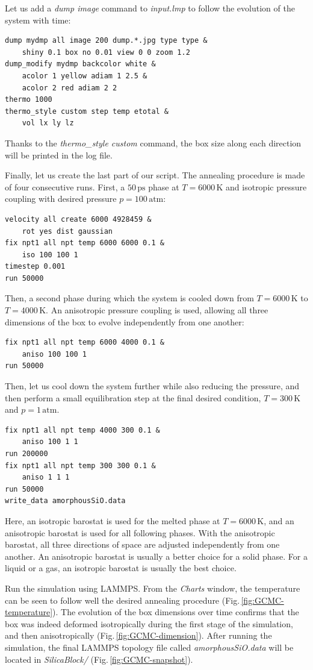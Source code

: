 \documentclass[9pt,tutorial]{livecoms}
\begin{document}
Let us add a \textit{dump image} command to \textit{input.lmp} to follow the
evolution of the system with time:
{\normalsize \begin{verbatim}
dump mydmp all image 200 dump.*.jpg type type &
    shiny 0.1 box no 0.01 view 0 0 zoom 1.2
dump_modify mydmp backcolor white &
    acolor 1 yellow adiam 1 2.5 &
    acolor 2 red adiam 2 2
thermo 1000
thermo_style custom step temp etotal &
    vol lx ly lz
\end{verbatim}}
Thanks to the \textit{thermo\_style custom} command, the box size along each direction
will be printed in the log file.

Finally, let us create the last part of our script. The annealing procedure is
made of four consecutive runs. First, a $50\,\text{ps}$ phase at $T = 6000\,\text{K}$
and isotropic pressure coupling with desired pressure $p = 100\,\text{atm}$:
{\normalsize \begin{verbatim}
velocity all create 6000 4928459 &
    rot yes dist gaussian
fix npt1 all npt temp 6000 6000 0.1 &
    iso 100 100 1
timestep 0.001
run 50000
\end{verbatim}}
Then, a second phase during which the system is cooled down from $T = 6000\,\text{K}$
to $T = 4000\,\text{K}$. An anisotropic pressure coupling is used, allowing all
three dimensions of the box to evolve independently from one another:
{\normalsize \begin{verbatim}
fix npt1 all npt temp 6000 4000 0.1 &
    aniso 100 100 1
run 50000
\end{verbatim}}
Then, let us cool down the system further while also reducing the pressure, and then
perform a small equilibration step at the final desired condition, $T = 300\,\text{K}$ and $p = 1\,\text{atm}$.
{\normalsize \begin{verbatim}
fix npt1 all npt temp 4000 300 0.1 &
    aniso 100 1 1
run 200000
fix npt1 all npt temp 300 300 0.1 &
    aniso 1 1 1
run 50000
write_data amorphousSiO.data
\end{verbatim}}
Here, an isotropic barostat is used for the melted phase at $T = 6000\,\text{K}$,
and an anisotropic barostat is used for all following phases. With the anisotropic
barostat, all three directions of space are adjusted independently from one another.
An anisotropic barostat is usually a better choice for a solid phase. For a liquid
or a gas, an isotropic barostat is usually the best choice.

Run the simulation using LAMMPS. From the \textit{Charts} window, the temperature
can be seen to follow well the desired annealing procedure (Fig.\,\ref{fig:GCMC-temperature}).
The evolution of the box dimensions over time confirms that the box was indeed
deformed isotropically during the first stage of the simulation, and then anisotropically
(Fig.\,\ref{fig:GCMC-dimension}). After running
the simulation, the final LAMMPS topology file called \textit{amorphousSiO.data}
will be located in \textit{SilicaBlock/} (Fig.\,\ref{fig:GCMC-snapshot}).
\end{document}
